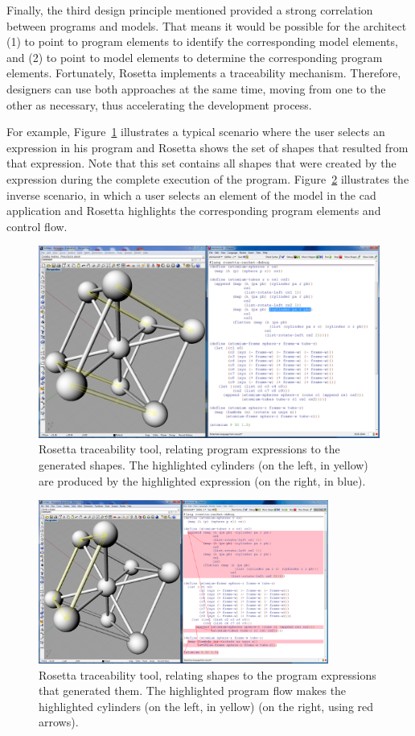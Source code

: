 Finally, the third design principle mentioned provided a strong correlation between programs and models. That means it would be possible for the architect (1) to point to program elements to identify the corresponding model elements, and (2) to point to model elements to determine the corresponding program elements. Fortunately, Rosetta implements a traceability mechanism. Therefore, designers can use both approaches at the same time, moving from one to the other as necessary, thus accelerating the development process.

For example, Figure~\ref{fig:program-shape} illustrates a typical scenario where the user selects an expression in his program and
Rosetta shows the set of shapes that resulted from that expression. Note that this set contains all shapes that were created by the expression during the complete execution of the program. Figure~\ref{fig:shape-program} illustrates the inverse scenario, in which a user selects an element of the model in the \gls{cad} application and Rosetta highlights the corresponding program elements and control flow.

\begin{figure}[h]
  \centering
  \includegraphics[width=.85\textwidth]{images/program-to-shape}
    \caption{Rosetta traceability tool, relating program expressions to the generated shapes. The highlighted cylinders (on the left, in yellow) are produced by the highlighted expression (on the right, in blue).}
  \label{fig:program-shape}
\end{figure}

\begin{figure}[!htbp]
  \centering
  \includegraphics[width=0.85\textwidth]{images/shape-to-program}
    \caption{Rosetta traceability tool, relating shapes to the program expressions that generated them. The highlighted program flow makes the highlighted cylinders (on the left, in yellow) (on the right, using red arrows).}
  \label{fig:shape-program}
\end{figure}

